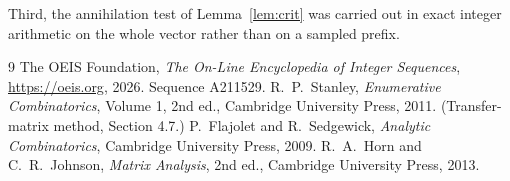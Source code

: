 \documentclass[11pt,a4paper]{article}
\theoremstyle{plain}
\theoremstyle{definition}
\begin{document}
Third, the annihilation test of Lemma~\ref{lem:crit} was carried out in exact integer
arithmetic on the whole vector rather than on a sampled prefix.

\begin{thebibliography}{9}
 The OEIS Foundation, \emph{The On-Line Encyclopedia of Integer
Sequences}, \url{https://oeis.org}, 2026. Sequence A211529.
 R.~P.~Stanley, \emph{Enumerative Combinatorics}, Volume 1, 2nd ed.,
Cambridge University Press, 2011. (Transfer-matrix method, Section 4.7.)
 P.~Flajolet and R.~Sedgewick, \emph{Analytic Combinatorics}, Cambridge
University Press, 2009.
 R.~A.~Horn and C.~R.~Johnson, \emph{Matrix Analysis}, 2nd ed., Cambridge
University Press, 2013.
\end{thebibliography}
\end{document}
